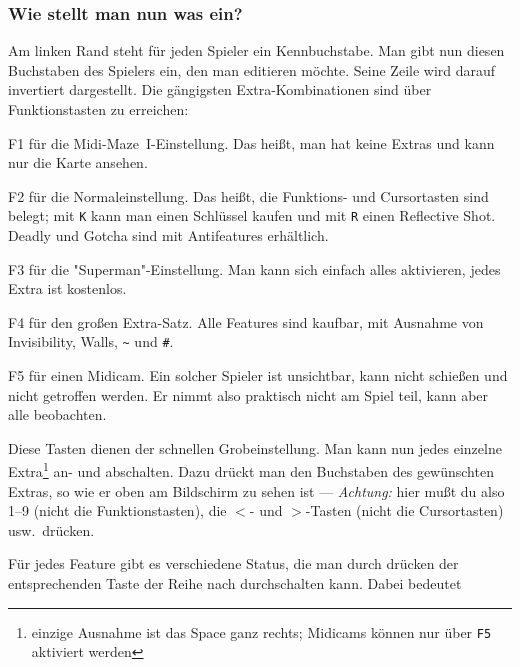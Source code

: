 \documentclass[12pt,twoside]{article}
\newcommand{\mmI}{{\sc Midi-Maze}}
\newcommand{\deflabel}[1]{\bf #1\hfill}%
\newenvironment{deflist}[1]%
{\begin{list}{}%
{\settowidth{\labelwidth}{\bf #1}%
\setlength{\leftmargin}{\labelwidth}%
\addtolength{\leftmargin}{\labelsep}%
\renewcommand{\makelabel}{\deflabel}}}%
{\end{list}}%
\begin{document}
\subsubsection{Wie stellt man nun was ein?}


Am linken Rand steht f\"ur jeden Spieler ein Kennbuchstabe. Man gibt nun 
diesen Buchstaben des Spielers ein, den man editieren m\"ochte. Seine Zeile 
wird darauf invertiert dargestellt. Die g\"angigsten Extra-Kombinationen sind 
\"uber Funktionstasten zu erreichen:


\begin{deflist}{F10}

\item[F1] f\"ur die \mmI~I-Einstellung. Das hei\ss{}t, man hat keine Extras und 
kann nur die Karte ansehen.


\item[F2] f\"ur die Normaleinstellung. Das hei\ss{}t, die Funktions- und 
Cursortasten sind belegt; mit \verb|K| kann man einen Schl\"ussel kaufen und 
mit \verb|R| einen Reflective Shot. Deadly und Gotcha sind mit Antifeatures 
erh\"altlich.


\item[F3] f\"ur die "Superman"-Einstellung. Man kann sich einfach alles 
aktivieren, jedes Extra ist kostenlos.


\item[F4] f\"ur den gro\ss{}en Extra-Satz. Alle Features sind kaufbar, mit 
Ausnahme von Invisibility, Walls, \verb|~| und \verb|#|.


\item[F5] f\"ur einen Midicam. Ein solcher Spieler ist unsichtbar, kann nicht 
schie\-\ss{}en und nicht getroffen werden. Er nimmt also praktisch nicht am 
Spiel teil, kann aber alle beobachten.

\end{deflist}


Diese Tasten dienen der schnellen Grobeinstellung. Man kann nun jedes 
einzelne Extra\footnote{einzige Ausnahme ist das Space ganz rechts; Midicams 
k\"onnen nur \"uber \texttt{F5} aktiviert werden} an- und abschalten. Dazu dr\"uckt 
man den Buchstaben des gew\"unschten Extras, so wie er oben am Bildschirm zu 
sehen ist --- {\em Achtung:\/} hier mu\ss{}t du also 1--9 (nicht die 
Funktionstasten), die $<$- und $>$-Tasten (nicht die Cursortasten) usw.\ 
dr\"ucken.


F\"ur jedes Feature gibt es verschiedene Status, die man durch dr\"ucken der 
entsprechenden Taste der Reihe nach durchschalten kann. Dabei bedeutet
\end{document}
